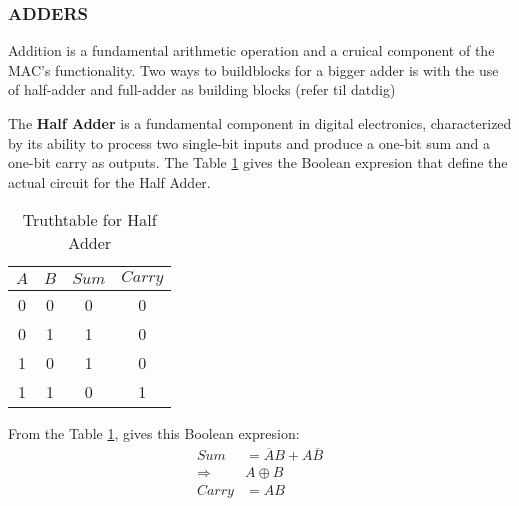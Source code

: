 
\subsubsection{ADDERS}
Addition is a fundamental arithmetic operation and a cruical component of the MAC's functionality. Two ways to buildblocks for a bigger adder is with the use of half-adder and full-adder as building blocks (refer til datdig)


The \textbf{Half Adder} is a fundamental component in digital electronics, characterized by its ability to process two single-bit inputs and produce a one-bit sum and a one-bit carry as outputs. The Table \ref{Truthtable for Half Adder} gives the Boolean expresion that define the actual circuit for the Half Adder.


\begin{table}[H]
    \centering
    \caption{Truthtable for Half Adder}\label{Truthtable for Half Adder}                 
    \begin{tabular}{|c|c|c|c|}
        \hline
        \(A\) & \(B\) & \(Sum\) & \(Carry\) \\
        \hline
        0 & 0 & 0 & 0 \\
        0 & 1 & 1 & 0 \\
        1 & 0 & 1 & 0 \\
        1 & 1 & 0 & 1 \\
        \hline
        
    \end{tabular}
\end{table}

From the Table \ref{Truthtable for Half Adder},  gives this Boolean expresion:
\begin{equation}
    \begin{aligned}
        Sum&=\overline{A}B+A\overline{B}\\
        \Rightarrow&A\oplus B\\
        Carry&=AB\\ 
    \end{aligned}
\end{equation}





